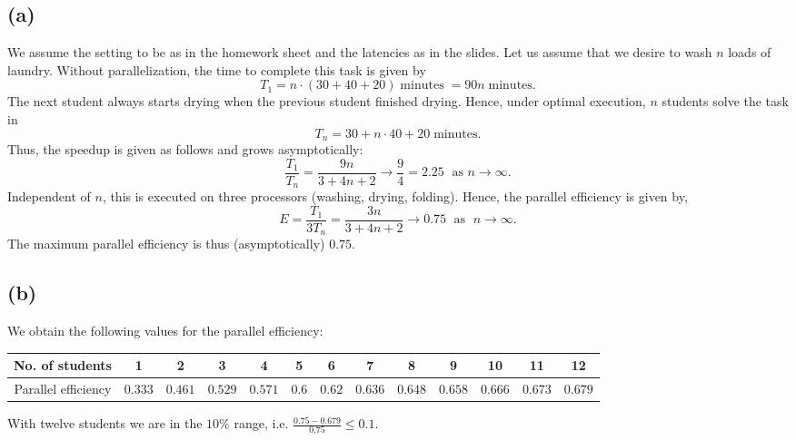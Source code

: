 \subsection*{(a)}
We assume the setting to be as in the homework sheet and the latencies as in the slides. Let us assume that we desire to wash $n$ loads of laundry. Without parallelization, the time to complete this task is given by
\[
T_1 = n \cdot (30 + 40 + 20) \; \text{minutes} \; = 90n \; \text{minutes}.
\]
The next student always starts drying when the previous student finished drying. Hence, under optimal execution, $n$ students solve the task in
\[
T_n = 30 + n \cdot 40 + 20 \; \text{minutes}.
\]
Thus, the speedup is given as follows and grows asymptotically: 
\[
\frac{T_1}{T_n} =\frac{9n}{3 + 4n + 2} \rightarrow \frac{9}{4} = 2.25 \; \text{ as } n \to \infty.
\]
Independent of $n$, this is executed on three processors (washing, drying, folding). Hence, the parallel efficiency is given by,
\[
E = \frac{T_1}{3 T_n} = \frac{3n}{3 + 4n + 2} \rightarrow 0.75 \; \text{ as } \; n \to \infty.
\]
The maximum parallel efficiency is thus (asymptotically) $0.75$.

\subsection*{(b)}
\FloatBarrier
We obtain the following values for the parallel efficiency:

\begin{center}
\begin{tabular}{c|c|c|c|c|c|c|c|c|c|c|c|c|}
No. of students & 1 & 2 & 3 & 4 & 5 & 6 & 7 & 8 & 9 & 10 & 11 & 12 \\ 
\hline 
Parallel efficiency & $0.333$ & $0.461$ & $0.529$ & $0.571$ & $0.6$ & $0.62$ & $0.636$ & $0.648$ & $0.658$ & $0.666$ & $0.673$ & $0.679$ \\ 
\hline 
\end{tabular}
\end{center}

With twelve students we are in the $10\%$ range, i.e. $\frac{0.75 - 0.679}{0.75} \leq 0.1$.


